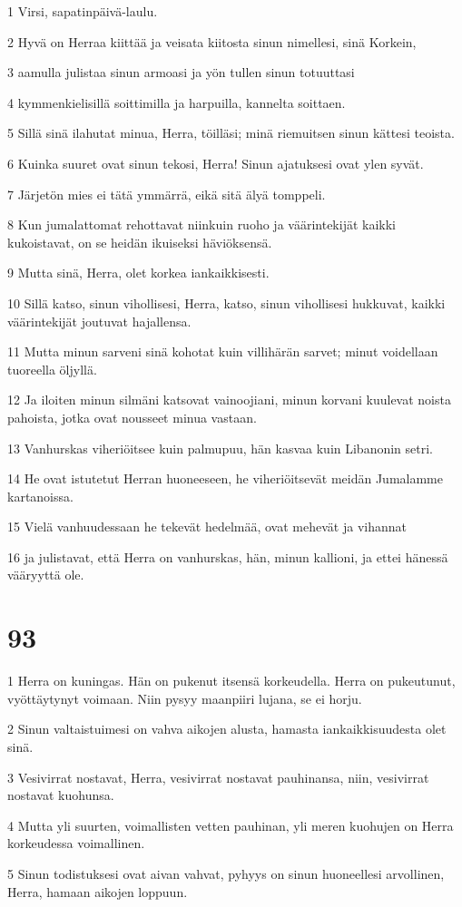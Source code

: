 \par 1 Virsi, sapatinpäivä-laulu.
\par 2 Hyvä on Herraa kiittää ja veisata kiitosta sinun nimellesi, sinä Korkein,
\par 3 aamulla julistaa sinun armoasi ja yön tullen sinun totuuttasi
\par 4 kymmenkielisillä soittimilla ja harpuilla, kannelta soittaen.
\par 5 Sillä sinä ilahutat minua, Herra, töilläsi; minä riemuitsen sinun kättesi teoista.
\par 6 Kuinka suuret ovat sinun tekosi, Herra! Sinun ajatuksesi ovat ylen syvät.
\par 7 Järjetön mies ei tätä ymmärrä, eikä sitä älyä tomppeli.
\par 8 Kun jumalattomat rehottavat niinkuin ruoho ja väärintekijät kaikki kukoistavat, on se heidän ikuiseksi häviöksensä.
\par 9 Mutta sinä, Herra, olet korkea iankaikkisesti.
\par 10 Sillä katso, sinun vihollisesi, Herra, katso, sinun vihollisesi hukkuvat, kaikki väärintekijät joutuvat hajallensa.
\par 11 Mutta minun sarveni sinä kohotat kuin villihärän sarvet; minut voidellaan tuoreella öljyllä.
\par 12 Ja iloiten minun silmäni katsovat vainoojiani, minun korvani kuulevat noista pahoista, jotka ovat nousseet minua vastaan.
\par 13 Vanhurskas viheriöitsee kuin palmupuu, hän kasvaa kuin Libanonin setri.
\par 14 He ovat istutetut Herran huoneeseen, he viheriöitsevät meidän Jumalamme kartanoissa.
\par 15 Vielä vanhuudessaan he tekevät hedelmää, ovat mehevät ja vihannat
\par 16 ja julistavat, että Herra on vanhurskas, hän, minun kallioni, ja ettei hänessä vääryyttä ole.

\chapter{93}

\par 1 Herra on kuningas. Hän on pukenut itsensä korkeudella. Herra on pukeutunut, vyöttäytynyt voimaan. Niin pysyy maanpiiri lujana, se ei horju.
\par 2 Sinun valtaistuimesi on vahva aikojen alusta, hamasta iankaikkisuudesta olet sinä.
\par 3 Vesivirrat nostavat, Herra, vesivirrat nostavat pauhinansa, niin, vesivirrat nostavat kuohunsa.
\par 4 Mutta yli suurten, voimallisten vetten pauhinan, yli meren kuohujen on Herra korkeudessa voimallinen.
\par 5 Sinun todistuksesi ovat aivan vahvat, pyhyys on sinun huoneellesi arvollinen, Herra, hamaan aikojen loppuun.

